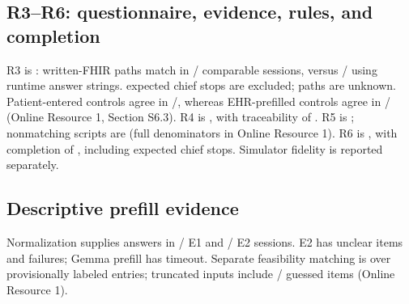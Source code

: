\begin{table}[t]\centering
\caption{E1 written-resource verification. Input checks are excluded; exceptions
would prevent acceptance.}\label{tab:e1}
\footnotesize\setlength{\tabcolsep}{3pt}

\end{table}
\begin{table}[t]\centering
\caption{E1 workflow and semantic round trip. Read uses all sessions; write uses
attempted writes; read-back uses returned references; round trip uses all captured
submissions, including those without read-back.}\label{tab:e1workflow}
\scriptsize\setlength{\tabcolsep}{3pt}

\end{table}

\subsection{R3--R6: questionnaire, evidence, rules, and completion}
R3 is \textbf{\RThreeVerdict{}}: written-FHIR paths match in
\ETwoWrittenPathAgree{}/\ETwoWrittenPathCompared{} comparable sessions, versus
\ETwoFixtureActualPathAgree{}/\ETwoFixtureActualPathCompared{} using runtime
answer strings. \ETwoWrittenPathExcluded{} expected chief stops are excluded;
\ETwoWrittenPathUnknown{} paths are unknown.
Patient-entered controls agree in
\ETwoWrittenPathPatientControllerAgree{}/\ETwoWrittenPathPatientControllerCompared{},
whereas EHR-prefilled controls agree in
\ETwoWrittenPathEhrControllerAgree{}/\ETwoWrittenPathEhrControllerCompared{}
(Online Resource 1, Section S6.3). R4 is \textbf{\RFourVerdict{}}, with traceability
of \ETwoTraceability{}. R5 is \textbf{\RFiveVerdict{}}; nonmatching scripts are
\RFiveFailingScripts{} (full denominators in Online Resource 1).
R6 is \textbf{\RSixVerdict{}}, with completion of \ETwoCompletion{}, including
\ETwoChiefStopsCompleted{} expected chief stops. Simulator fidelity is reported separately.

\subsection{Descriptive prefill evidence}
Normalization supplies answers in \EOnePrefillStatusNormalized{}/\EOnePrefillSessions{}
E1 and \ETwoPrefillStatusNormalized{}/\ETwoPrefillSessions{} E2 sessions.
E2 has \ETwoPrefillUnclearEntries{} unclear items and \ETwoPrefillFailed{} failures;
Gemma prefill has \EThreeLocalPrefillFailed{} timeout.
Separate feasibility matching is \PrefillFeasibilityExactRate{} over
\PrefillFeasibilityScored{} provisionally labeled entries; truncated inputs include
\PrefillFeasibilityTruncatedGuessed{}/\PrefillFeasibilityTruncated{} guessed items
(Online Resource 1).

